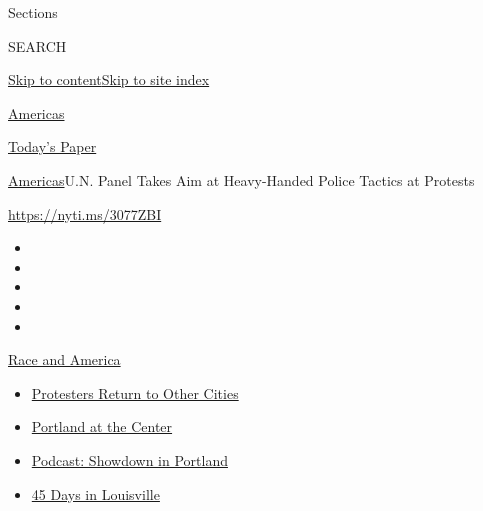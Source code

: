 Sections

SEARCH

\protect\hyperlink{site-content}{Skip to
content}\protect\hyperlink{site-index}{Skip to site index}

\href{https://www.nytimes3xbfgragh.onion/section/world/americas}{Americas}

\href{https://myaccount.nytimes3xbfgragh.onion/auth/login?response_type=cookie\&client_id=vi}{}

\href{https://www.nytimes3xbfgragh.onion/section/todayspaper}{Today's
Paper}

\href{/section/world/americas}{Americas}\textbar{}U.N. Panel Takes Aim
at Heavy-Handed Police Tactics at Protests

\url{https://nyti.ms/3077ZBI}

\begin{itemize}
\item
\item
\item
\item
\item
\end{itemize}

\href{https://www.nytimes3xbfgragh.onion/news-event/george-floyd-protests-minneapolis-new-york-los-angeles?action=click\&pgtype=Article\&state=default\&region=TOP_BANNER\&context=storylines_menu}{Race
and America}

\begin{itemize}
\tightlist
\item
  \href{https://www.nytimes3xbfgragh.onion/2020/07/26/us/protests-portland-seattle-trump.html?action=click\&pgtype=Article\&state=default\&region=TOP_BANNER\&context=storylines_menu}{Protesters
  Return to Other Cities}
\item
  \href{https://www.nytimes3xbfgragh.onion/2020/07/24/us/portland-oregon-protests-white-race.html?action=click\&pgtype=Article\&state=default\&region=TOP_BANNER\&context=storylines_menu}{Portland
  at the Center}
\item
  \href{https://www.nytimes3xbfgragh.onion/2020/07/23/podcasts/the-daily/portland-protests.html?action=click\&pgtype=Article\&state=default\&region=TOP_BANNER\&context=storylines_menu}{Podcast:
  Showdown in Portland}
\item
  \href{https://www.nytimes3xbfgragh.onion/interactive/2020/07/16/us/black-lives-matter-protests-louisville-breonna-taylor.html?action=click\&pgtype=Article\&state=default\&region=TOP_BANNER\&context=storylines_menu}{45
  Days in Louisville}
\end{itemize}

